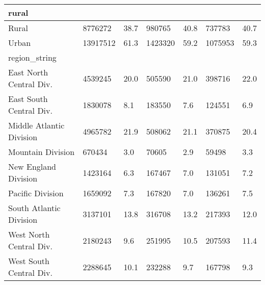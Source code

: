 \begin{longtable}{lllllll}
\midrule
\multicolumn{1}{l}{rural} \\ 
\midrule
Rural & 8776272 & 38.7 & 980765 & 40.8 & 737783 & 40.7 \\ 
Urban & 13917512 & 61.3 & 1423320 & 59.2 & 1075953 & 59.3 \\ 
\midrule
\multicolumn{1}{l}{region\_string} \\ 
\midrule
East North Central Div. & 4539245 & 20.0 & 505590 & 21.0 & 398716 & 22.0 \\ 
East South Central Div. & 1830078 & 8.1 & 183550 & 7.6 & 124551 & 6.9 \\ 
Middle Atlantic Division & 4965782 & 21.9 & 508062 & 21.1 & 370875 & 20.4 \\ 
Mountain Division & 670434 & 3.0 & 70605 & 2.9 & 59498 & 3.3 \\ 
New England Division & 1423164 & 6.3 & 167467 & 7.0 & 131051 & 7.2 \\ 
Pacific Division & 1659092 & 7.3 & 167820 & 7.0 & 136261 & 7.5 \\ 
South Atlantic Division & 3137101 & 13.8 & 316708 & 13.2 & 217393 & 12.0 \\ 
West North Central Div. & 2180243 & 9.6 & 251995 & 10.5 & 207593 & 11.4 \\ 
West South Central Div. & 2288645 & 10.1 & 232288 & 9.7 & 167798 & 9.3 \\ 
\bottomrule
\end{longtable}

